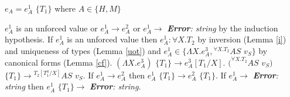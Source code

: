 \begin{case}

$e_{A}=e_{A}^{1}$ $\lbrace T_{1}\rbrace$ where $A\in\lbrace H,M\rbrace$

$e_{A}^{1}$ is an unforced value or $e_{A}^{1}\rightarrow e_{A}^{2}$ or $e_{A}^{1}\rightarrow$ \emph{\textbf{Error}: string} by the induction hypothesis.  If $e_{A}^{1}$ is an unforced value then $e_{A}^{1}:\forall X.T_{2}$ by inversion (Lemma \ref{i}) and uniqueness of types (Lemma \ref{uot}) and $e_{A}^{1}\in\lbrace\Lambda X.e_{A}^{3},{^{\forall X.T_{2}}A}S$ $v_{S}\rbrace$ by canonical forms (Lemma \ref{cf}).  $(\Lambda X.e_{A}^{3})$ $\lbrace T_{1}\rbrace\rightarrow e_{A}^{3}[T_{1}/X]$.  $(^{\forall X.T_{2}}AS$ $v_{S})$ $\lbrace T_{1}\rbrace\rightarrow{^{T_{2}[T_{1}^{a}/X]}A}S$ $v_{S}$.  If $e_{A}^{1}\rightarrow e_{A}^{2}$ then $e_{A}^{1}$ $\lbrace T_{1}\rbrace\rightarrow e_{A}^{2}$ $\lbrace T_{1}\rbrace$.  If $e_{A}^{1}\rightarrow$ \emph{\textbf{Error}: string} then $e_{A}^{1}$ $\lbrace T_{1}\rbrace\rightarrow$ \emph{\textbf{Error}: string}.

\end{case}
